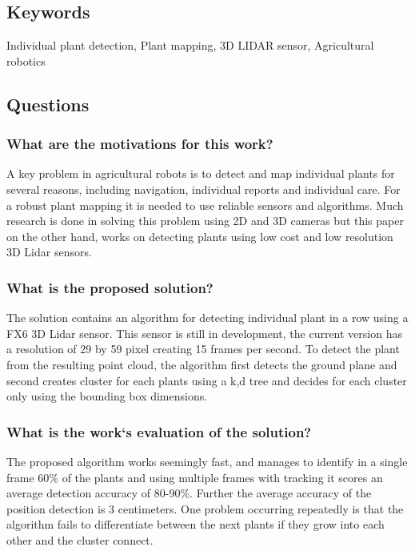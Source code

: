 \subsection*{Keywords}
Individual plant detection, Plant mapping, 3D LIDAR sensor, Agricultural robotics


\subsection*{Questions}

\subsubsection*{What are the motivations for this work?} 
A key problem in agricultural robots is to detect and map individual plants for several reasons, including 
navigation, individual reports and individual care. For a robust plant mapping it is needed to use reliable
sensors and algorithms. Much research is done in solving this problem 
using 2D and 3D cameras but this paper on the other hand, works on detecting plants using low cost and low resolution
3D Lidar sensors. 
\subsubsection*{What is the proposed solution?}
The solution contains an algorithm for detecting individual plant in a row using a FX6 3D Lidar sensor. 
This sensor is still in development, the current version has a resolution of 29 by 59 pixel creating 15 frames per second.
To detect the plant from the resulting point cloud, the algorithm first detects the ground plane and second  
creates cluster for each plants using a k,d tree and decides for each cluster only using the bounding box dimensions.
\subsubsection*{What is the work`s evaluation of the solution?}
The proposed algorithm works seemingly fast, and manages to identify in a single frame 60\% of the plants
and using multiple frames with tracking it scores an average detection accuracy of 80-90\%. Further the average accuracy 
of the position detection is 3 centimeters. One problem occurring repeatedly is that the algorithm fails to differentiate
between the next plants if they grow into each other and the cluster connect. 

